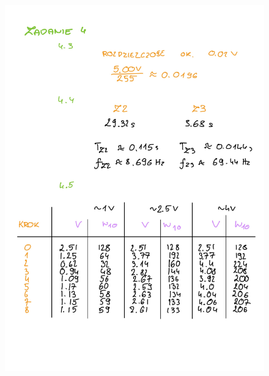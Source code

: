 \documentclass[14pt, table]{extarticle}
\begin{document}
\begin{figure}[H]
\includegraphics[scale=0.2]{B2}
\centering
\captionsetup{labelformat=empty}
\caption{}
\end{figure}
\end{document}
